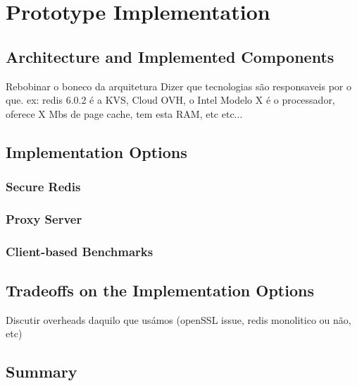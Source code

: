 
\chapter{Prototype Implementation}
\label{cha:elaboration_plan}

\section{Architecture and Implemented Components}
\label{sec:architecture_implementation_components}

Rebobinar o boneco da arquitetura
	Dizer que tecnologias são responsaveis por o que. ex: redis 6.0.2 é a KVS, Cloud OVH, o Intel Modelo X é o processador, oferece X Mbs de page cache, tem esta RAM, etc etc...

\section{Implementation Options}
\label{sec:implementation_options}

\subsection{Secure Redis}
\label{ssec:secure_redis}

\subsection{Proxy Server}
\label{ssec:proxy_server}

\subsection{Client-based Benchmarks}
\label{ssec:client_based_benchmarks}

\section{Tradeoffs on the Implementation Options}
\label{sec:tradeoffs_implementation_options}

Discutir overheads daquilo que usámos (openSSL issue, redis monolitico ou não, etc)

\section{Summary}
\label{sec:summary}